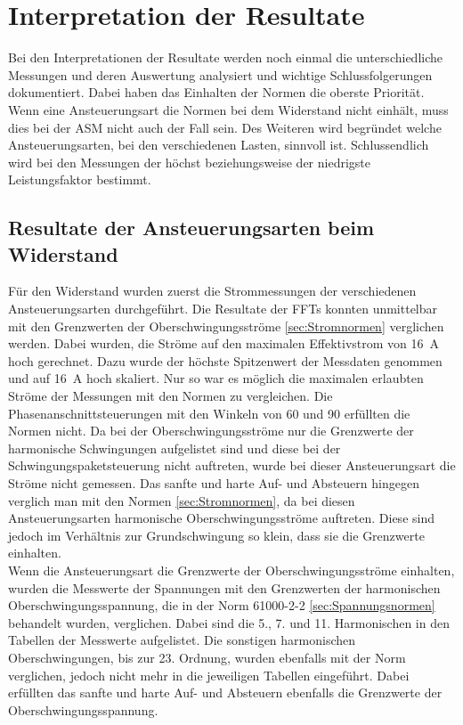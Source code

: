 \section{Interpretation der Resultate}\label{sec:Interpretation_Resultate}
Bei den Interpretationen der Resultate werden noch einmal die unterschiedliche Messungen und deren Auswertung analysiert und wichtige Schlussfolgerungen dokumentiert. Dabei haben das Einhalten der Normen die oberste Priorität. Wenn eine Ansteuerungsart die Normen bei dem Widerstand nicht einhält, muss dies bei der ASM nicht auch der Fall sein. Des Weiteren wird begründet welche Ansteuerungsarten, bei den verschiedenen Lasten, sinnvoll ist. Schlussendlich wird bei den Messungen der höchst beziehungsweise der niedrigste Leistungsfaktor bestimmt.


\subsection{Resultate der Ansteuerungsarten beim Widerstand}
Für den Widerstand wurden zuerst die Strommessungen der verschiedenen Ansteuerungsarten durchgeführt. Die Resultate der FFTs konnten unmittelbar mit den Grenzwerten der Oberschwingungsströme \ref{sec:Stromnormen} verglichen werden. Dabei wurden, die Ströme auf den maximalen Effektivstrom von \SI{16}{A} hoch gerechnet. Dazu wurde der höchste Spitzenwert der Messdaten genommen und auf \SI{16}{A} hoch skaliert. Nur so war es möglich die maximalen erlaubten Ströme der Messungen mit den Normen zu vergleichen. Die Phasenanschnittsteuerungen mit den Winkeln von 60\textdegree \hspace{0.02cm} und 90\textdegree \hspace{0.02cm} erfüllten die Normen nicht. Da bei der Oberschwingungsströme nur die Grenzwerte der harmonische Schwingungen aufgelistet sind und diese bei der Schwingungspaketsteuerung nicht auftreten, wurde bei dieser Ansteuerungsart die Ströme nicht gemessen. Das sanfte und harte Auf- und Absteuern hingegen verglich man mit den Normen \ref{sec:Stromnormen}, da bei diesen Ansteuerungsarten harmonische Oberschwingungsströme auftreten. Diese sind jedoch im Verhältnis zur Grundschwingung so klein, dass sie die Grenzwerte einhalten.\\ 

Wenn die Ansteuerungsart die Grenzwerte der Oberschwingungsströme einhalten, wurden die Messwerte der Spannungen mit den Grenzwerten der harmonischen Oberschwingungsspannung, die in der Norm 61000-2-2 \ref{sec:Spannungsnormen} behandelt wurden, verglichen. Dabei sind die 5., 7. und 11. Harmonischen in den Tabellen der Messwerte aufgelistet. Die sonstigen harmonischen Oberschwingungen, bis zur 23. Ordnung, wurden ebenfalls mit der Norm verglichen, jedoch nicht mehr in die jeweiligen Tabellen eingeführt. Dabei erfüllten das sanfte und harte Auf- und Absteuern ebenfalls die Grenzwerte der Oberschwingungsspannung.\\

